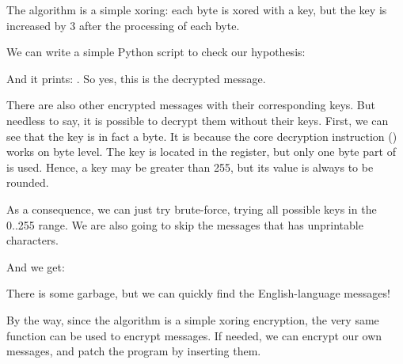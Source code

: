 The algorithm is a simple \gls{xoring}: each 
byte is xored with a key, but the key is increased by 3 after the processing of each byte.

We can write a simple Python script to check our hypothesis:



And it prints: .
So yes, this is the decrypted message.

There are also 
other encrypted messages with their corresponding keys.
But needless to say, it is possible 
to decrypt them without their keys.
First, we can see that the key 
is in fact a byte.
It is because the core decryption instruction
(\XOR) works on byte level. 
The key is located in the \ESI register, but only one byte part of \ESI is used.
Hence, a key may be greater than 255, 
but its value is always to be rounded.

As a consequence, we can just try brute-force, trying all possible keys in the 0..255 range.
We are also going to skip 
the messages that has unprintable characters.



And we get:



There 
is some garbage, but we can quickly find the English-language messages!

By the way, since the algorithm is a simple xoring encryption, the very same function can be used
to encrypt messages.
If needed, we can encrypt our own messages, and patch the program by inserting them.

